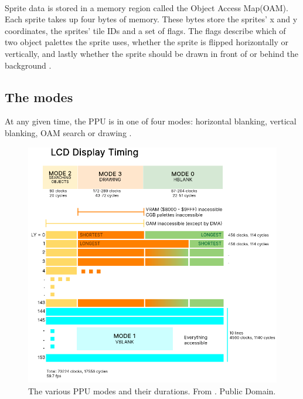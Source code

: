 \\
Sprite data is stored in a memory region called the Object Access Map(OAM). Each sprite takes up four bytes of memory. These bytes store the sprites' x and y coordinates, the sprites' tile IDs and a set of flags. The flags describe which of two object palettes the sprite uses, whether the sprite is flipped horizontally or vertically, and lastly whether the sprite should be drawn in front of or behind the background \cite{pandocsVideo}.

\subsection{The modes}
\label{sec:PPU_Modes}
At any given time, the PPU is in one of four modes: horizontal blanking, vertical blanking, OAM search or drawing \cite{pandocsVideo}.

\begin{figure}[H]
    \centering
    \includegraphics[scale=0.5]{figures/PPU/Mode_diagram.png}
    \caption{The various PPU modes and their durations. From \cite{pandocs}. Public Domain.}
    \label{fig:PPU_timing}
\end{figure}

